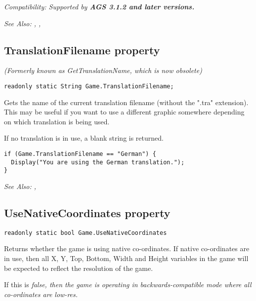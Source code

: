 \it{Compatibility:} Supported by \bf{AGS 3.1.2} and later versions.

\it{See Also:} ,
,


\subsection{TranslationFilename property}\label{Game.TranslationFilename}%

\it{(Formerly known as GetTranslationName, which is now obsolete)}

\begin{verbatim}
readonly static String Game.TranslationFilename;
\end{verbatim}
Gets the name of the current translation filename (without the ".tra" extension).
This may be useful if you want to use a different graphic somewhere depending on
which translation is being used.

If no translation is in use, a blank string is returned.

\begin{verbatim}
if (Game.TranslationFilename == "German") {
  Display("You are using the German translation.");
}
\end{verbatim}

\it{See Also:} ,


\subsection{UseNativeCoordinates property}\label{Game.UseNativeCoordinates}%

\begin{verbatim}
readonly static bool Game.UseNativeCoordinates
\end{verbatim}
Returns whether the game is using native co-ordinates. If native co-ordinates are in use,
then all X, Y, Top, Bottom, Width and Height variables in the game will be expected to
reflect the resolution of the game.

If this is \it{false}, then the game is operating in backwards-compatible mode where
all co-ordinates are low-res.

